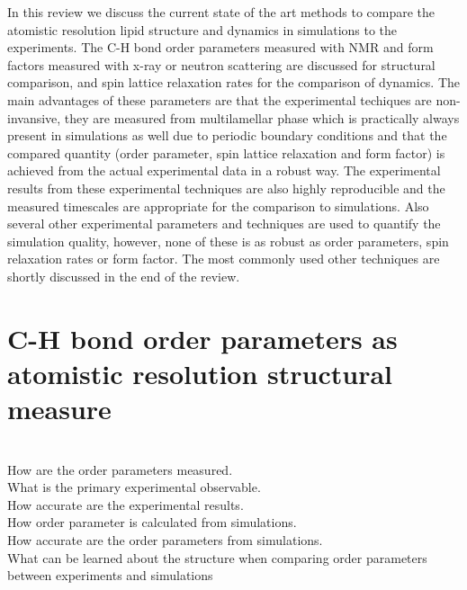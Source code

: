 \documentclass[aps,prl,superscriptaddress,twocolumn]{revtex4}
\begin{document}
In this review we discuss the current state of the art methods to compare the 
atomistic resolution lipid structure and dynamics in simulations to the experiments. 
The C-H bond order parameters measured with NMR and form factors measured
with x-ray or neutron scattering are discussed for structural comparison,
and spin lattice relaxation rates for the comparison of dynamics.
The main advantages of these parameters are that
the experimental techiques are non-invansive, they are measured from multilamellar phase 
which is practically always present in simulations as well due to periodic boundary conditions
and that the compared quantity (order parameter, spin lattice relaxation and form factor) is achieved from 
the actual experimental data in a robust way. The experimental results from these
experimental techniques are also highly reproducible and the measured timescales
are appropriate for the comparison to simulations. Also several other experimental
parameters and techniques are used to quantify the simulation quality, however,
none of these is as robust as order parameters, spin relaxation rates or form factor. The most
commonly used other techniques are shortly discussed in the end of the review.

\section{C-H bond order parameters as atomistic resolution structural measure}


\\[0.1cm]

\noindent How are the order parameters measured.\\
What is the primary experimental observable. \\
How accurate are the experimental results. \\
How order parameter is calculated from simulations. \\
How accurate are the order parameters from simulations. \\
What can be learned about the structure when comparing order parameters between experiments and simulations \\[0.5 cm]
\end{document}
